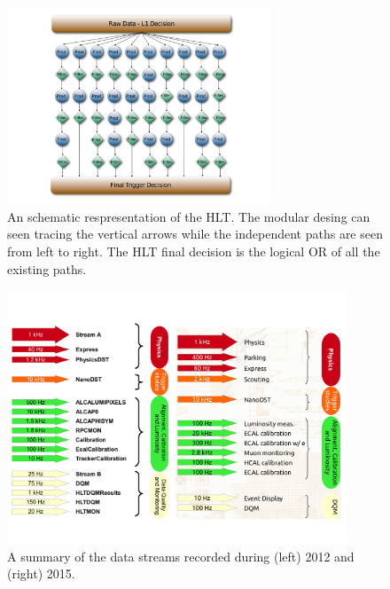 \begin{figure}
 \centering
\includegraphics[width=0.7\textwidth]{CMS_DetectorFigures/HLT_TriggerAlgo.pdf}
\caption{An schematic respresentation of the HLT. The modular desing
  can seen tracing the vertical arrows while the independent paths
  are seen from left to right. The HLT final decision is the logical
  OR of all the existing paths.\label{fig:HLT}}
\end{figure}

\begin{figure}
 \centering
\includegraphics[width=0.9\textwidth]{CMS_DetectorFigures/HLT_Paths.pdf}
\caption{A summary of the data streams recorded during (left) 2012 and
  (right) 2015.\label{fig:HLT_Streams}}
\end{figure}